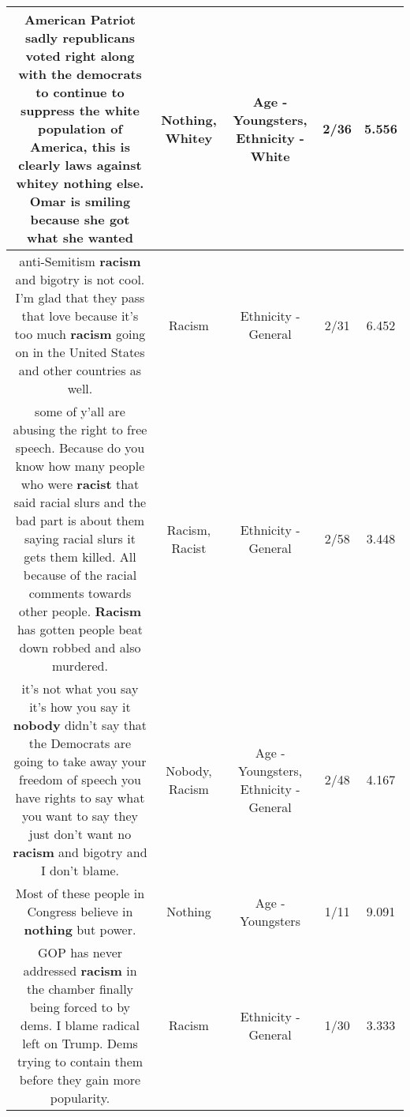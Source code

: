 \documentclass[11pt]{article}
\newlength\mylength
\begin{document}
\begin{center}
\begin{longtable}{|C{.65\mylength}|C{.30\mylength}|C{.12\mylength}|C{.12\mylength}|C{.12\mylength}|}
  \small American Patriot sadly republicans voted right along with the democrats to continue to suppress the white population of America, this is clearly laws against \textbf{whitey} \textbf{nothing} else. Omar is smiling because she got what she wanted\normalsize   & Nothing, Whitey & Age - Youngsters, Ethnicity - White & 2/36 & 5.556 \\  \hline
  \small {} anti-Semitism \textbf{racism} and bigotry is not cool. I'm glad that they pass that love because it's too much \textbf{racism} going on in the United States and other countries as well.\normalsize   & Racism & Ethnicity - General & 2/31 & 6.452 \\  \hline
  \small {} some of y'all are  abusing the right to free speech. Because do you know how many people who were \textbf{racist} that said racial slurs and the bad part is about them saying racial slurs it gets them killed. All because of the racial comments towards other people. \textbf{Racism} has gotten people beat down robbed and also murdered.\normalsize   & Racism, Racist & Ethnicity - General & 2/58 & 3.448 \\  \hline
  \small {} it's not what you say it's how you say it \textbf{nobody} didn't say that the Democrats are going to take away your freedom of speech you have rights to say what you want to say they just don't want no \textbf{racism} and bigotry and I don't blame.\normalsize   & Nobody, Racism & Age - Youngsters, Ethnicity - General & 2/48 & 4.167 \\  \hline
  \small Most of these people in Congress believe in \textbf{nothing} but power.\normalsize   & Nothing & Age - Youngsters & 1/11 & 9.091 \\  \hline
  \small GOP has never addressed \textbf{racism} in the chamber finally being forced to by dems. I blame radical left on Trump. Dems trying to contain them before they gain more popularity.\normalsize   & Racism & Ethnicity - General & 1/30 & 3.333 \\  \hline

\end{longtable}
\end{center}
\end{document}
